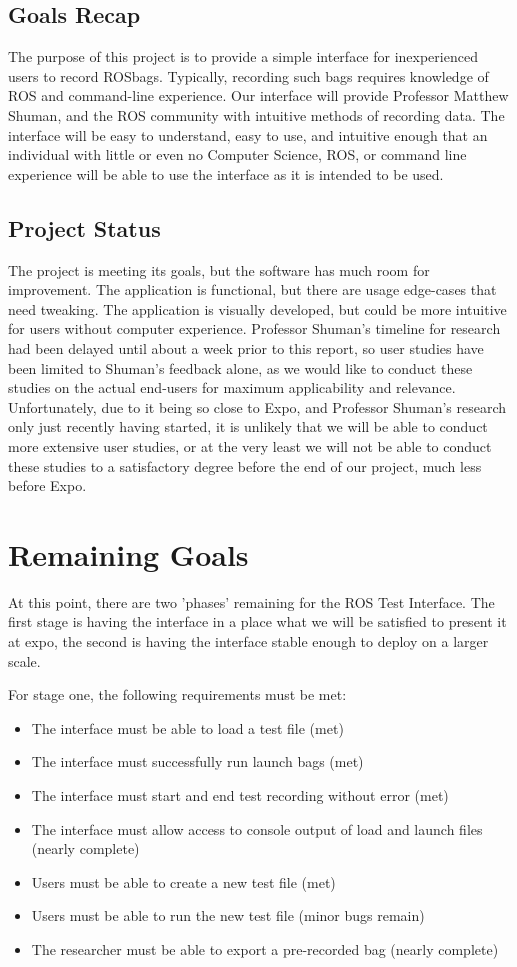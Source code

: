 \documentclass[onecolumn, draftclsnofoot,10pt, compsoc]{IEEEtran}
\begin{document}
\subsection{Goals Recap}
The purpose of this project is to provide a simple interface for inexperienced users to record ROSbags. Typically, recording such bags requires knowledge of ROS and command-line experience. Our interface will provide Professor Matthew Shuman, and the ROS community with intuitive methods of recording data. The interface will be easy to understand, easy to use, and intuitive enough that an individual with little or even no Computer Science, ROS, or command line experience will be able to use the interface as it is intended to be used.

\subsection{Project Status}
The project is meeting its goals, but the software has much room for improvement. The application is functional, but there are usage edge-cases that need tweaking. The application is visually developed, but could be more intuitive for users without computer experience. Professor Shuman’s timeline for research had been delayed until about a week prior to this report, so user studies have been limited to Shuman's feedback alone, as we would like to conduct these studies on the actual end-users for maximum applicability and relevance. Unfortunately, due to it being so close to Expo, and Professor Shuman's research only just recently having started, it is unlikely that we will be able to conduct more extensive user studies, or at the very least we will not be able to conduct these studies to a satisfactory degree before the end of our project, much less before Expo.

\section{Remaining Goals}
At this point, there are two 'phases' remaining for the ROS Test Interface. The first stage is having the interface in a place what we will be satisfied to present it at expo, the second is having the interface stable enough to deploy on a larger scale. 

For stage one, the following requirements must be met:
\begin{itemize}
	\item The interface must be able to load a test file (met)
	\item The interface must successfully run launch bags (met)
	\item The interface must start and end test recording without error (met)
	\item The interface must allow access to console output of load and launch files (nearly complete)
	\item Users must be able to create a new test file (met)
	\item Users must be able to run the new test file (minor bugs remain)
	\item The researcher must be able to export a pre-recorded bag (nearly complete)
\end{itemize}
\end{document}
